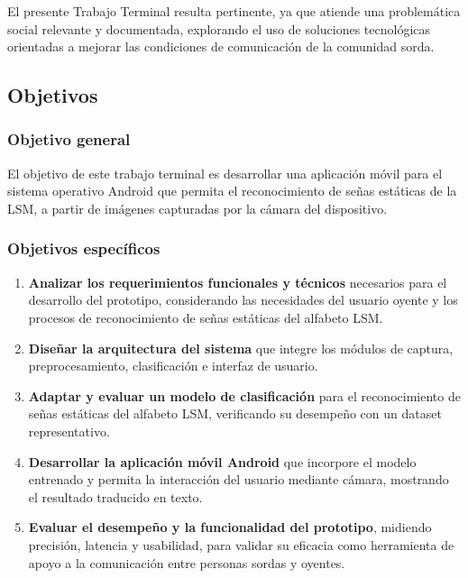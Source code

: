 	El presente Trabajo Terminal resulta pertinente, ya que atiende una problemática social relevante y documentada, explorando el uso de soluciones tecnológicas orientadas a mejorar las condiciones de comunicación de la comunidad sorda.

	\subsection{Objetivos}
	\subsubsection{Objetivo general}
	
	El objetivo de este trabajo terminal es desarrollar una aplicación móvil para el sistema operativo Android que permita el reconocimiento de señas estáticas de la LSM, a partir de imágenes capturadas por la cámara del dispositivo. 
	
	\subsubsection{Objetivos específicos}
	\begin{enumerate}
		\item \textbf{Analizar los requerimientos funcionales y técnicos} necesarios para el desarrollo del prototipo, considerando las necesidades del usuario oyente y los procesos de reconocimiento de señas estáticas del alfabeto LSM.
		 
		\item \textbf{Diseñar la arquitectura del sistema} que integre los módulos de captura, preprocesamiento, clasificación e interfaz de usuario. 
		
		\item  \textbf{Adaptar y evaluar un modelo de clasificación } para el reconocimiento de señas estáticas del alfabeto LSM, verificando su desempeño con un dataset representativo. 
		
		\item \textbf{Desarrollar la aplicación móvil Android }que incorpore el modelo entrenado y permita la interacción del usuario mediante cámara, mostrando el resultado traducido en texto. 
		
		\item \textbf{Evaluar el desempeño y la funcionalidad del prototipo}, midiendo precisión, latencia y usabilidad, para validar su eficacia como herramienta de apoyo a la comunicación entre personas sordas y oyentes. 
		
	\end{enumerate}
	

